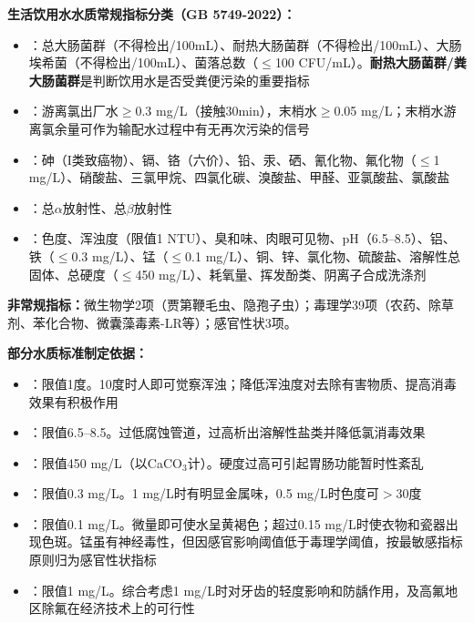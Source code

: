 \documentclass[10pt,a4paper,oneside]{ctexbook}
\begin{document}
\begin{tipbox}
\textbf{生活饮用水水质常规指标分类（GB 5749-2022）：}
\begin{itemize}[leftmargin=*]
    \item {}：总大肠菌群（不得检出/100mL）、耐热大肠菌群（不得检出/100mL）、大肠埃希菌（不得检出/100mL）、菌落总数（$\leq$100 CFU/mL）。\textbf{耐热大肠菌群/粪大肠菌群}是判断饮用水是否受粪便污染的重要指标
    \item {}：游离氯出厂水$\geq$0.3 mg/L（接触30min），末梢水$\geq$0.05 mg/L；末梢水游离氯余量可作为输配水过程中有无再次污染的信号
    \item {}：砷（I类致癌物）、镉、铬（六价）、铅、汞、硒、氰化物、氟化物（$\leq$1 mg/L）、硝酸盐、三氯甲烷、四氯化碳、溴酸盐、甲醛、亚氯酸盐、氯酸盐
    \item {}：总$\alpha$放射性、总$\beta$放射性
    \item {}：色度、浑浊度（限值1 NTU）、臭和味、肉眼可见物、pH（6.5--8.5）、铝、铁（$\leq$0.3 mg/L）、锰（$\leq$0.1 mg/L）、铜、锌、氯化物、硫酸盐、溶解性总固体、总硬度（$\leq$450 mg/L）、耗氧量、挥发酚类、阴离子合成洗涤剂
\end{itemize}

\textbf{非常规指标：}微生物学2项（贾第鞭毛虫、隐孢子虫）；毒理学39项（农药、除草剂、苯化合物、微囊藻毒素-LR等）；感官性状3项。
\end{tipbox}

\begin{tipbox}
\textbf{部分水质标准制定依据：}
\begin{itemize}[leftmargin=*]
    \item {}：限值1度。10度时人即可觉察浑浊；降低浑浊度对去除有害物质、提高消毒效果有积极作用
    \item {}：限值6.5--8.5。过低腐蚀管道，过高析出溶解性盐类并降低氯消毒效果
    \item {}：限值450 mg/L（以CaCO$_3$计）。硬度过高可引起胃肠功能暂时性紊乱
    \item {}：限值0.3 mg/L。1 mg/L时有明显金属味，0.5 mg/L时色度可$>$30度
    \item {}：限值0.1 mg/L。微量即可使水呈黄褐色；超过0.15 mg/L时使衣物和瓷器出现色斑。锰虽有神经毒性，但因感官影响阈值低于毒理学阈值，按最敏感指标原则归为感官性状指标
    \item {}：限值1 mg/L。综合考虑1 mg/L时对牙齿的轻度影响和防龋作用，及高氟地区除氟在经济技术上的可行性
\end{itemize}
\end{tipbox}
\end{document}
